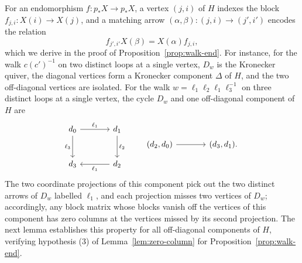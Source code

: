 \documentclass[a4paper,reqno,10pt]{amsart}
\theoremstyle{definition}
\numberwithin{equation}{section}
\begin{document}
For an endomorphism $f:p_*X\to p_*X$, a vertex $(j,i)$ of $H$ indexes the
block $f_{j,i}:X(i)\to X(j)$, and
a matching arrow $(\alpha,\beta):(j,i)\to(j',i')$ encodes the relation
\begin{equation}\label{eq:walk-block}
 f_{j',i'}X(\beta)=X(\alpha)f_{j,i},
\end{equation}
which we derive in the proof of Proposition~\ref{prop:walk-end}.
For instance, for the walk $c(c')^{-1}$ on two distinct loops at a single
vertex, $D_w$ is the Kronecker quiver, the diagonal vertices form a
Kronecker component $\Delta$ of $H$, and the two off-diagonal vertices are isolated.
For the walk $w=\ell_1\ell_2\ell_1\ell_3^{-1}$ on three distinct loops at a single vertex, the
cycle $D_w$ and one off-diagonal component of $H$ are
\[
\begin{tikzcd}[column sep=large,row sep=large]
 d_0\arrow[r,"\ell_1"]\arrow[d,"\ell_3"']&d_1\arrow[d,"\ell_2"]\\
 d_3&d_2\arrow[l,"\ell_1"]
\end{tikzcd}
\qquad
\begin{tikzcd}[column sep=large]
 (d_2,d_0)\arrow[r]&(d_3,d_1).
\end{tikzcd}
\]
The two coordinate projections of this component pick out the two distinct arrows of $D_w$
labelled $\ell_1$, and each projection misses two vertices of $D_w$; accordingly, any block matrix
whose blocks vanish off the vertices of this component has zero columns at the vertices
missed by its second projection.
The next lemma establishes this property for all off-diagonal components of $H$, verifying hypothesis (3) of
Lemma~\ref{lem:zero-column} for Proposition~\ref{prop:walk-end}.
\end{document}
